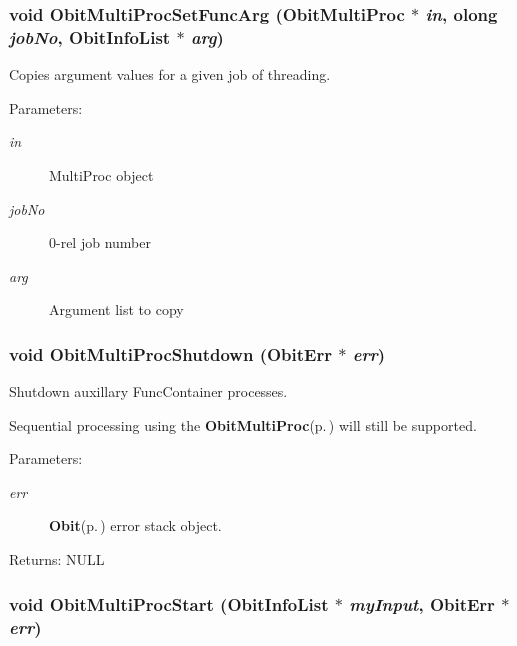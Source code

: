 \subsubsection{\setlength{\rightskip}{0pt plus 5cm}void Obit\-Multi\-Proc\-Set\-Func\-Arg ({\bf Obit\-Multi\-Proc} $\ast$ {\em in}, {\bf olong} {\em job\-No}, {\bf Obit\-Info\-List} $\ast$ {\em arg})}\label{ObitMultiProc_8c_a18}


Copies argument values for a given job of threading. 

\begin{Desc}
\item[Parameters:]
\begin{description}
\item[{\em in}]Multi\-Proc object \item[{\em job\-No}]0-rel job number \item[{\em arg}]Argument list to copy \end{description}
\end{Desc}
\subsubsection{\setlength{\rightskip}{0pt plus 5cm}void Obit\-Multi\-Proc\-Shutdown ({\bf Obit\-Err} $\ast$ {\em err})}\label{ObitMultiProc_8c_a17}


Shutdown auxillary Func\-Container processes. 

Sequential processing using the {\bf Obit\-Multi\-Proc}{\rm (p.\,\pageref{structObitMultiProc})} will still be supported. \begin{Desc}
\item[Parameters:]
\begin{description}
\item[{\em err}]{\bf Obit}{\rm (p.\,\pageref{structObit})} error stack object. \end{description}
\end{Desc}
\begin{Desc}
\item[Returns:]NULL \end{Desc}
\subsubsection{\setlength{\rightskip}{0pt plus 5cm}void Obit\-Multi\-Proc\-Start ({\bf Obit\-Info\-List} $\ast$ {\em my\-Input}, {\bf Obit\-Err} $\ast$ {\em err})}\label{ObitMultiProc_8c_a16}


